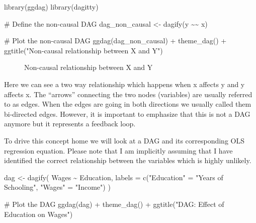 \documentclass[
  letterpaper,
  DIV=11,
  numbers=noendperiod]{scrreprt}
\newenvironment{Shaded}{\begin{snugshade}}{\end{snugshade}}
\newcommand{\AttributeTok}[1]{\textcolor[rgb]{0.40,0.45,0.13}{#1}}
\newcommand{\CommentTok}[1]{\textcolor[rgb]{0.37,0.37,0.37}{#1}}
\newcommand{\ErrorTok}[1]{\textcolor[rgb]{0.68,0.00,0.00}{#1}}
\newcommand{\FunctionTok}[1]{\textcolor[rgb]{0.28,0.35,0.67}{#1}}
\newcommand{\NormalTok}[1]{\textcolor[rgb]{0.00,0.23,0.31}{#1}}
\newcommand{\OtherTok}[1]{\textcolor[rgb]{0.00,0.23,0.31}{#1}}
\newcommand{\SpecialCharTok}[1]{\textcolor[rgb]{0.37,0.37,0.37}{#1}}
\newcommand{\StringTok}[1]{\textcolor[rgb]{0.13,0.47,0.30}{#1}}
\theoremstyle{definition}
\theoremstyle{remark}
\begin{document}
\begin{Shaded}
\begin{Highlighting}[]
\FunctionTok{library}\NormalTok{(ggdag)}
\FunctionTok{library}\NormalTok{(dagitty)}

\CommentTok{\# Define the non{-}causal DAG}
\NormalTok{dag\_non\_causal }\OtherTok{\textless{}{-}} \FunctionTok{dagify}\NormalTok{(y }\SpecialCharTok{\textasciitilde{}}\ErrorTok{\textasciitilde{}}\NormalTok{ x)}

\CommentTok{\# Plot the non{-}causal DAG}
\FunctionTok{ggdag}\NormalTok{(dag\_non\_causal) }\SpecialCharTok{+} 
  \FunctionTok{theme\_dag}\NormalTok{() }\SpecialCharTok{+}
  \FunctionTok{ggtitle}\NormalTok{(}\StringTok{"Non{-}causal relationship between X and Y"}\NormalTok{)}
\end{Highlighting}
\end{Shaded}

\begin{figure}[H]


\caption{\label{fig-non-causal-graph}Non-causal relationship between X
and Y}

\end{figure}%

Here we can see a two way relationship which happens when x affects y
and y affects x. The ``arrows'' connecting the two nodes (variables) are
usually referred to as edges. When the edges are going in both
directions we usually called them bi-directed edges. However, it is
important to emphasize that this is not a DAG anymore but it represents
a feedback loop.

To drive this concept home we will look at a DAG and its corresponding
OLS regression equation. Please note that I am implicitly assuming that
I have identified the correct relationship between the variables which
is highly unlikely.

\begin{Shaded}
\begin{Highlighting}[]
\NormalTok{dag }\OtherTok{\textless{}{-}} \FunctionTok{dagify}\NormalTok{(}
\NormalTok{  Wages }\SpecialCharTok{\textasciitilde{}}\NormalTok{ Education,}
  \AttributeTok{labels =} \FunctionTok{c}\NormalTok{(}\StringTok{"Education"} \OtherTok{=} \StringTok{"Years of Schooling"}\NormalTok{, }\StringTok{"Wages"} \OtherTok{=} \StringTok{"Income"}\NormalTok{)}
\NormalTok{)}

\CommentTok{\# Plot the DAG}
\FunctionTok{ggdag}\NormalTok{(dag) }\SpecialCharTok{+} 
  \FunctionTok{theme\_dag}\NormalTok{() }\SpecialCharTok{+}
  \FunctionTok{ggtitle}\NormalTok{(}\StringTok{"DAG: Effect of Education on Wages"}\NormalTok{)}
\end{Highlighting}
\end{Shaded}
\end{document}
